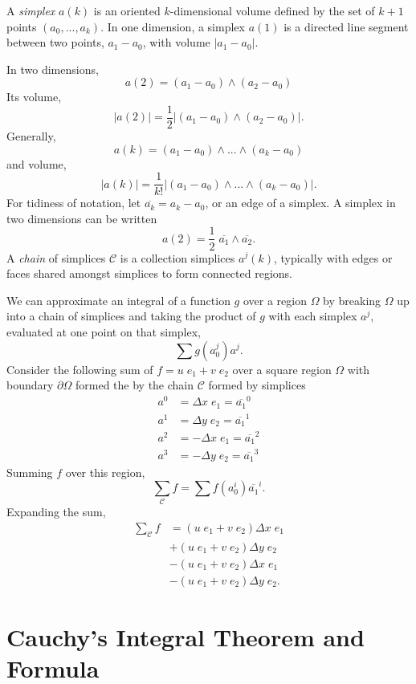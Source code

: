 	A \emph{simplex} $a\left(k\right)$ is an oriented $k$-dimensional volume defined by the set of $k + 1$ points $\left(a_0, ... , a_k\right)$. In one dimension, a simplex $a\left(1\right)$ is a directed line segment between two points, $a_1 - a_0$, with volume $|a_1 - a_0|$.
	
	In two dimensions, 	
	\[
	a\left(2\right) = \left(a_1 - a_0\right)\wedge\left(a_2 - a_0\right)
	\]
	Its volume, 
	\[
	|a\left(2\right)| = \frac{1}{2}|\left(a_1 - a_0\right) \wedge \left(a_2 - a_0\right)|.
	\]
	Generally,
	\[
	a\left(k\right) = \left(a_1 - a_0\right)\wedge ... \wedge\left(a_k - a_0\right)
	\]
	and volume,
	\[
	|a\left(k\right)| = \frac{1}{k!}|\left(a_1 - a_0\right) \wedge...\wedge \left(a_k - a_0\right)|.
	\]
	For tidiness of notation, let $\overline{a_k} = a_k - a_0$, or an edge of a simplex. A simplex in two dimensions can be written
	\[
	a\left(2\right) = \frac{1}{2}\;\overline{a_1} \wedge \overline{a_2}. 
	\] 	
	A \emph{chain} of simplices $\mathcal{C}$ is a collection simplices $a^j\left(k\right)$, typically with edges or faces shared amongst simplices to form connected regions.
	
	We can approximate an integral of a function $g$ over a region $\Omega$ by breaking $\Omega$ up into a chain of simplices and taking the product of $g$ with each simplex $a^j$, evaluated at one point on that simplex,
	\[
	\sum g\left(a^j_0\right) a^j.
	\]
	Consider the following sum of $f=u\;e_1 + v\;e_2$ over a square region $\Omega$ with boundary $\partial\Omega$ formed the by the chain $\mathcal{C}$ formed by simplices
	\begin{align*}
	a^0 &= \Delta x\;e_1 = \overline{a_1}^0 \\
	a^1 &= \Delta y\;e_2 =\overline{a_1}^1 \\
	a^2 &= -\Delta x\;e_1 =\overline{a_1}^2 \\
	a^3 &= -\Delta y\;e_2 =\overline{a_1}^3
	\end{align*}
	Summing $f$ over this region,
	\[
	\sum_\mathcal{C} f = \sum f\left(a^i_0\right) \overline{a_1}^i.	
	\]
	Expanding the sum,
	\begin{align*}
	\sum_\mathcal{C} f &= \left(u\;e_1 + v\;e_2\right)\Delta x\;e_1 \\
	&+ \left(u\;e_1 + v\;e_2\right)\Delta y\;e_2 \\
	&- \left(u\;e_1 + v\;e_2\right)\Delta x\;e_1 \\
	&- \left(u\;e_1 + v\;e_2\right)\Delta y\;e_2.
	\end{align*}
	
	\section{Cauchy's Integral Theorem and Formula}
	
	